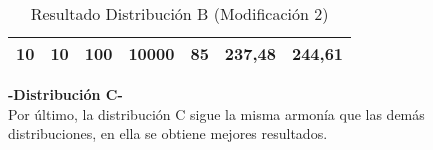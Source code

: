 \documentclass{article}
\begin{document}
\begin{table}[h]
\begin{tabular}{lllllll}
			\multicolumn{1}{|l|}{\multirow{-4}{*}{10}}                             & \multicolumn{1}{l|}{\multirow{-4}{*}{10}}      & \multicolumn{1}{l|}{\multirow{-4}{*}{100}}                            & \multicolumn{1}{l|}{10000}                                                & \multicolumn{1}{l|}{85}                                                      & \multicolumn{1}{l|}{237,48}                                                         & \multicolumn{1}{l|}{244,61}                                                           \\ \hline
		\end{tabular}
	\caption{Resultado Distribución B (Modificación 2)}
	\end{table}

	\newpage

	\textbf{-Distribución C-} \\
	
	Por último, la distribución C sigue la misma armonía que las demás distribuciones, en ella se obtiene mejores resultados.
	
\end{document}
